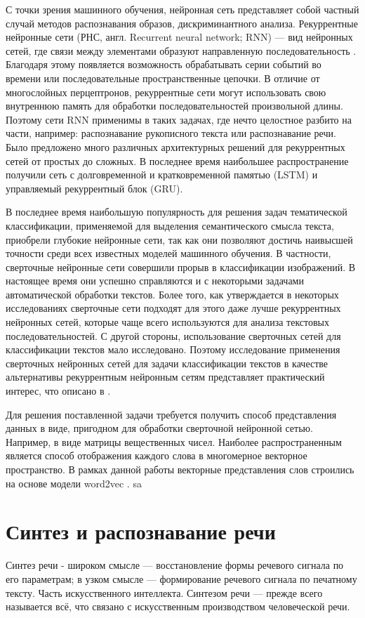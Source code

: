 С точки зрения машинного обучения, нейронная сеть представляет собой частный случай методов распознавания образов, дискриминантного анализа.
Рекуррентные нейронные сети (РНС, англ. Recurrent neural network; RNN) — вид нейронных сетей, где связи между элементами образуют 
направленную последовательность \cite{Wikipedia01}. Благодаря этому появляется возможность обрабатывать серии событий во времени или последовательные 
пространственные цепочки. В отличие от многослойных перцептронов, рекуррентные сети могут использовать свою внутреннюю память для 
обработки последовательностей произвольной длины. Поэтому сети RNN применимы в таких задачах, где нечто целостное разбито на части, 
например: распознавание рукописного текста или распознавание речи. Было предложено много различных архитектурных решений для 
рекуррентных сетей от простых до сложных. В последнее время наибольшее распространение получили сеть с долговременной и 
кратковременной памятью (LSTM) и управляемый рекуррентный блок (GRU).

В последнее время наибольшую популярность для решения задач тематической классификации, применяемой для выделения семантического смысла текста,
приобрели глубокие нейронные сети, так как они позволяют достичь наивысшей точности среди всех известных моделей машинного обучения. 
В частности, сверточные нейронные сети совершили прорыв в классификации изображений. В настоящее время они успешно справляются и с 
некоторыми задачами автоматической обработки текстов. Более того, как утверждается в некоторых исследованиях сверточные сети подходят 
для этого даже лучше рекуррентных нейронных сетей, которые чаще всего используются для анализа текстовых последовательностей. 
С другой стороны, использование сверточных сетей для классификации текстов мало исследовано. Поэтому исследование применения 
сверточных нейронных сетей для задачи классификации текстов в качестве альтернативы рекуррентным нейронным сетям представляет 
практический интерес, что описано в \cite{neural10}.

Для решения поставленной задачи требуется получить способ представления данных в виде, пригодном для обработки сверточной нейронной сетью. 
Например, в виде матрицы вещественных чисел. Наиболее распространенным является способ отображения каждого слова в многомерное 
векторное пространство. В рамках данной работы векторные представления слов строились на основе модели word2vec \cite{cyberlinka01}.
sa

\section{Синтез и распознавание речи}
Синтез речи - широком смысле — восстановление формы речевого сигнала по его параметрам; в узком смысле — формирование речевого сигнала по печатному тексту. 
Часть искусственного интеллекта. Синтезом речи — прежде всего называется всё, что связано с искусственным производством человеческой речи.

